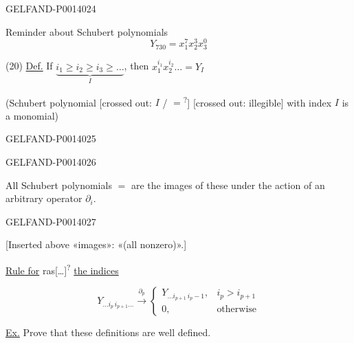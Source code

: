 \begin{GelfandAdjacentEvidence}{GELFAND-P001402}{4}



Reminder about Schubert polynomials
\[
Y_{730}=x_1^7x_2^3x_3^0
\]

(20) \uline{Def.} If \(\underbrace{i_1\ge i_2\ge i_3\ge\ldots}_{I}\),
then \(x_1^{i_1}x_2^{i_2}\ldots=Y_I\)

(Schubert polynomial
[crossed out: \(I\) / \(=\)\textsuperscript{?}]
[crossed out: illegible]
with index \(I\) is a monomial)

\end{GelfandAdjacentEvidence}
\begin{GelfandAdjacentEvidence}{GELFAND-P001402}{5}

\end{GelfandAdjacentEvidence}
\begin{GelfandAdjacentEvidence}{GELFAND-P001402}{6}



All Schubert polynomials \(=\)
are the images of these under the action of an arbitrary operator \(\partial_i\).

\end{GelfandAdjacentEvidence}
\begin{GelfandAdjacentEvidence}{GELFAND-P001402}{7}



[Inserted above «images»: «(all nonzero)».]

\uline{Rule for}
ras[…]\textsuperscript{?}
\uline{the indices}

\end{GelfandAdjacentEvidence}



\begin{equation*}
Y_{\ldots i_p\,i_{p+1}\ldots}
\xrightarrow{\partial_p}
\begin{cases}
Y_{\ldots i_{p+1}\,i_p-1},&i_p>i_{p+1}\\
0,&\text{otherwise}
\end{cases} \tag{21}
\end{equation*}

\uline{Ex.} Prove that these definitions are well defined.

